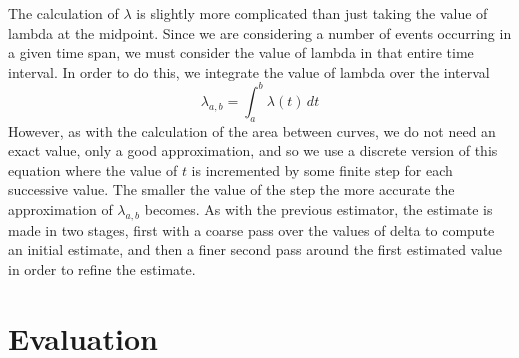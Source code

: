 \documentclass[a4paper,11pt]{article}
\begin{document}
The calculation of $\lambda$ is slightly more complicated than just taking the
value of lambda at the midpoint. Since we are considering a number of events
occurring in a given time span, we must consider the value of lambda in that
entire time interval. In order to do this, we integrate the value of lambda over
the interval
\begin{equation}
\lambda_{a,b}=\int_a^b\lambda(t)\,dt
\end{equation}
However, as with the calculation of the area between curves, we do not need an
exact value, only a good approximation, and so we use a discrete version of this
equation where the value of $t$ is incremented by some finite step for each successive
value. The smaller the value of the step the more accurate the approximation of
$\lambda_{a,b}$ becomes. As with the previous estimator, the estimate is made in
two stages, first with a coarse pass over the values of delta to compute an
initial estimate, and then a finer second pass around the first estimated value
in order to refine the estimate.
\section{Evaluation}
\label{sec-7}
\end{document}
